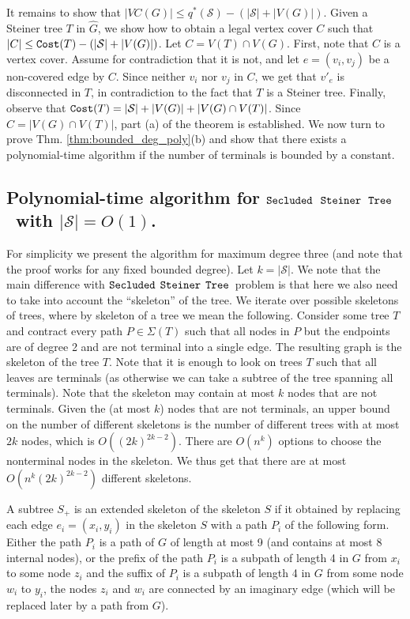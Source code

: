 \documentclass[12pt]{article}
\def\Cost{\mbox{\tt Cost}}
\newcommand{\PS}[0]{$\mbox{\tt Secluded}$ $\mbox{\tt Steiner}$
$\mbox{\tt Tree}$}
\newcommand{\Terminals}[0]{\mathcal{S}}
\def\Cost{\mbox{\tt Cost}}
\begin{document}
It remains to show that $|VC(G)| \leq q^{*}(\Terminals)-(|\Terminals|+|V(G)|)$.
Given a Steiner tree $T$ in $\widehat{G}$, we show how to obtain  a legal vertex cover $C$ such that $|C| \leq \Cost(T)-(|\Terminals|+|V(G)|)$.
Let $C=V(T) \cap V(G)$. First, note that $C$ is a vertex cover. Assume for contradiction that it is not, and let $e=(v_i,v_j)$ be a non-covered edge by $C$.
Since neither $v_i$ nor $v_j$ in $C$, we get that $v'_{e}$ is disconnected in $T$, in contradiction to the fact that $T$ is a Steiner tree. Finally, observe that
$\Cost(T)=|\Terminals|+|V(G)|+|V(G) \cap V(T)|$. Since $C=|V(G) \cap V(T)|$,
part (a) of the theorem is established.
We now turn to prove Thm. \ref{thm:bounded_deg_poly}(b) and show that there exists a polynomial-time algorithm if the number of terminals is bounded by a constant.
\subsection{Polynomial-time algorithm for \PS\ with $|\Terminals|=O(1)$.}
\label{subsec:multiterminals}
For simplicity we present the algorithm for maximum degree three (and note that the proof works for any fixed bounded degree).
Let $k=|\Terminals|$. We note that the main difference with \PS\ problem is that here we also need to take into account the ``skeleton'' of the tree.
We iterate over possible skeletons of trees, where by skeleton of a tree we mean the following.
Consider some tree $T$ and contract every path $P \in \Sigma(T)$ such that all nodes in $P$ but the endpoints are of degree 2 and are not terminal into a single edge. The resulting graph is the skeleton of the tree $T$. Note that it is enough to look on trees $T$ such that all leaves are terminals (as otherwise we can take a subtree of the tree spanning all terminals).
Note that the skeleton may contain at most $k$ nodes that are not terminals.
Given the (at most $k$) nodes that are not terminals, an upper bound on the number of different skeletons is the number of different trees with at most $2k$ nodes, which is $O((2k)^{2k - 2})$. There are $O(n^{k})$ options to choose the nonterminal nodes in the skeleton.
We thus get that there are at most $O(n^{k} (2k)^{2k - 2})$ different skeletons.

A subtree $S_{+}$ is an extended skeleton of the skeleton $S$ if it obtained by replacing each edge $e_i=(x_i,y_i)$ in the skeleton $S$ with a path $P_i$ of the following form. Either the path $P_i$ is a path of $G$ of length at most 9 (and contains at most 8 internal nodes), or the prefix of the path $P_i$ is a subpath of length 4 in $G$ from $x_i$ to some node $z_i$ and the suffix of $P_i$ is a subpath of length 4 in $G$ from some node $w_i$ to $y_i$, the nodes $z_i$ and $w_i$ are connected by an imaginary edge (which will be replaced later by a path from $G$).
\end{document}
